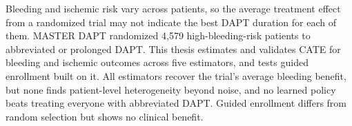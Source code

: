 
Bleeding and ischemic risk vary across patients, so the average treatment effect from a
randomized trial may not indicate the best DAPT duration for each of them. MASTER DAPT
randomized 4,579 high-bleeding-risk patients to abbreviated or prolonged DAPT. This thesis estimates and validates CATE for bleeding and
ischemic outcomes across five estimators, and tests guided enrollment
built on it. All estimators recover the trial's average bleeding benefit,
but none finds patient-level heterogeneity beyond noise, and no learned
policy beats treating everyone with abbreviated DAPT. Guided enrollment
differs from random selection but shows no clinical benefit.
